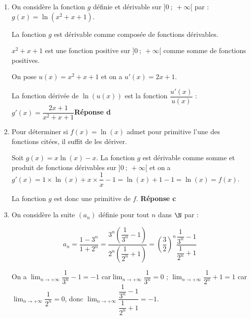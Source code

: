 
\medskip

%

\begin{enumerate}
\item On considère  la fonction $g$ définie et dérivable sur $]0~;~+ \infty[$ par :
$g(x) = \ln \left(x^2 + x + 1\right).$

La fonction $g$ est dérivable comme composée de fonctions dérivables.

$x^2+x+1$ est une fonction positive sur $]0~;~+\infty[$ comme somme de fonctions positives.

On pose $u(x)=x^2+x+1$ et on a $u'(x)=2x+1$.

La fonction  dérivée de $\ln (u(x))$ est la fonction $\dfrac{u'(x)}{u(x)}$ : $g'(x) = \dfrac{2x + 1}{x^2 + x + 1}$\hfill\textbf{Réponse d}

\item %
Pour déterminer si $f(x)=\ln(x)$ admet pour primitive l'une des fonctions citées, il suffit de les dériver.

Soit $g(x) = x\ln (x)- x$.
La fonction $g$ est dérivable comme somme et produit de fonctions dérivables sur $]0~;~+ \infty[$ et on a $g'(x)=1\times \ln(x)+x\times \dfrac{1}{x} - 1= \ln (x) + 1- 1 = \ln(x) = f(x)$.

La fonction $g$ est donc une primitive de $f$. \hfill \textbf{Réponse c}

\item On considère la suite $\left(a_n\right)$ définie  pour tout $n$ dans $\N$ par :

\[a_n = \dfrac{1 - 3^n}{1 + 2^n}=\dfrac{3^n\left(\dfrac{1}{3^n}-1\right)}{2^n\left(\dfrac{1}{2^n}+1\right)}=\left(\dfrac{3}{2}\right)^n \dfrac{\dfrac{1}{3^n}-1}{\dfrac{1}{2^n}+1}\]

On a 
$\displaystyle\lim_{n \to + \infty} \dfrac{1}{3^n}-1=-1$ car$\displaystyle\lim_{n \to + \infty}\dfrac{1}{3^n}=0$ ; $\displaystyle\lim_{n \to + \infty} \dfrac{1}{2^n}+1=1$ car$\displaystyle\lim_{n \to + \infty}\dfrac{1}{2^n}=0$, donc $\displaystyle\lim_{n \to + \infty}\dfrac{\dfrac{1}{3^n} - 1}{\dfrac{1}{2^n} + 1} = - 1$.


\end{enumerate}
